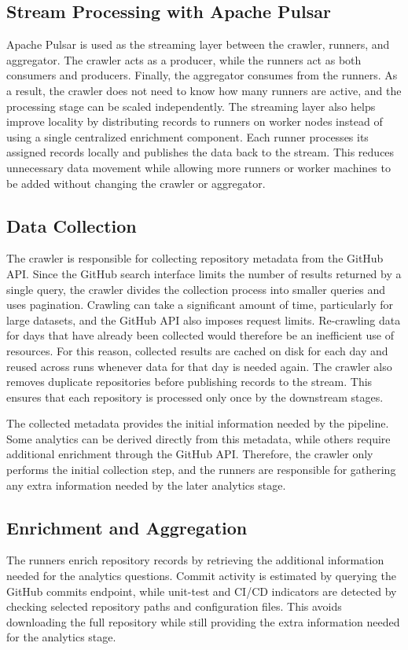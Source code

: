 \documentclass[conference]{IEEEtran}
\begin{document}
\subsection{Stream Processing with Apache Pulsar}
Apache Pulsar is used as the streaming layer between the crawler, runners, and
aggregator. The crawler acts as a producer, while the runners act as both
consumers and producers. Finally, the aggregator consumes from the runners. As a
result, the crawler does not need to know how many runners are active, and the
processing stage can be scaled independently. The streaming layer also helps
improve locality by distributing records to runners on worker nodes instead of
using a single centralized enrichment component. Each runner processes its
assigned records locally and publishes the data back to the stream. This reduces
unnecessary data movement while allowing more runners or worker machines to be
added without changing the crawler or aggregator.


\subsection{Data Collection}
The crawler is responsible for collecting repository metadata from the GitHub
API. Since the GitHub search interface limits the number of results returned by
a single query, the crawler divides the collection process into smaller queries
and uses pagination. Crawling can take a significant amount of time,
particularly for large datasets, and the GitHub API also imposes request limits.
Re-crawling data for days that have already been collected would therefore be an
inefficient use of resources. For this reason, collected results are cached on
disk for each day and reused across runs whenever data for that day is
needed again. The crawler also removes duplicate repositories before publishing
records to the stream. This ensures that each repository is processed only once
by the downstream stages.

The collected metadata provides the initial information needed by the pipeline.
Some analytics can be derived directly from this metadata, while others require
additional enrichment through the GitHub API. Therefore, the crawler only performs
the initial collection step, and the runners are responsible for gathering any
extra information needed by the later analytics stage.


\subsection{Enrichment and Aggregation}
The runners enrich repository records by retrieving the additional information
needed for the analytics questions. Commit activity is estimated by querying
the GitHub commits endpoint, while unit-test and CI/CD indicators are detected
by checking selected repository paths and configuration files. This avoids
downloading the full repository while still providing the extra information
needed for the analytics stage.
\end{document}
